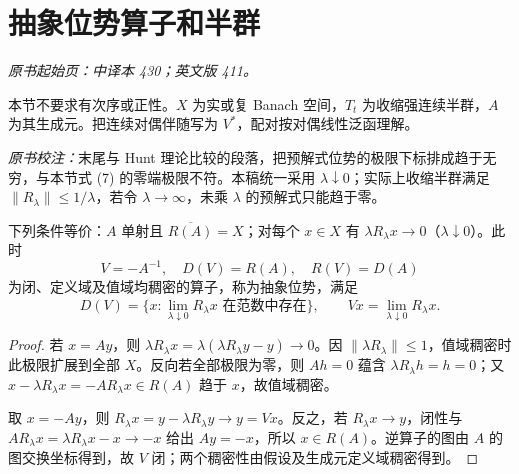 \section{抽象位势算子和半群}\label{sec:yosida-13-09}
\noindent\textit{原书起始页：中译本 430；英文版 411。}

本节不要求有次序或正性。$X$ 为实或复 Banach 空间，$T_t$ 为收缩强连续半群，$A$ 为其生成元。把连续对偶伴随写为 $V^*$，配对按对偶线性泛函理解。

\noindent\textit{原书校注：}末尾与 Hunt 理论比较的段落，把预解式位势的极限下标排成趋于无穷，与本节式 (7) 的零端极限不符。本稿统一采用 $\lambda\downarrow0$；实际上收缩半群满足 $\|R_\lambda\|\le1/\lambda$，若令 $\lambda\to\infty$，未乘 $\lambda$ 的预解式只能趋于零。

\begin{theorem}\label{thm:y13-abstract-potential}
下列条件等价：$A$ 单射且 $\overline{R(A)}=X$；对每个 $x\in X$ 有 $\lambda R_\lambda x\to0$（$\lambda\downarrow0$）。此时
\[
 V=-A^{-1},\quad D(V)=R(A),\quad R(V)=D(A)
\]
为闭、定义域及值域均稠密的算子，称为抽象位势，满足
\[
 D(V)=\{x:\lim_{\lambda\downarrow0}R_\lambda x\text{ 在范数中存在}\},\qquad
 Vx=\lim_{\lambda\downarrow0}R_\lambda x.
\]
\end{theorem}
\begin{proof}
若 $x=Ay$，则 $\lambda R_\lambda x=\lambda(\lambda R_\lambda y-y)\to0$。因 $\|\lambda R_\lambda\|\le1$，值域稠密时此极限扩展到全部 $X$。反向若全部极限为零，则 $Ah=0$ 蕴含 $\lambda R_\lambda h=h=0$；又 $x-\lambda R_\lambda x=-AR_\lambda x\in R(A)$ 趋于 $x$，故值域稠密。

取 $x=-Ay$，则 $R_\lambda x=y-\lambda R_\lambda y\to y=Vx$。反之，若 $R_\lambda x\to y$，闭性与 $AR_\lambda x=\lambda R_\lambda x-x\to-x$ 给出 $Ay=-x$，所以 $x\in R(A)$。逆算子的图由 $A$ 的图交换坐标得到，故 $V$ 闭；两个稠密性由假设及生成元定义域稠密得到。
\end{proof}


